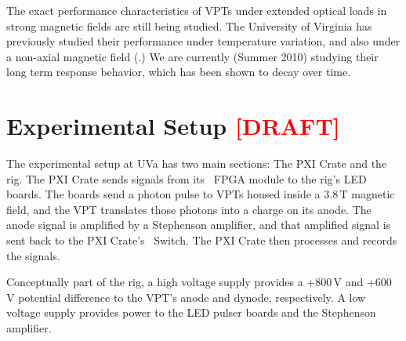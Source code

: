 The exact performance characteristics of VPTs under extended optical loads in strong magnetic fields are still being studied.  The University of Virginia has previously studied their performance under temperature variation, and also under a non-axial magnetic field (.)  We are currently (Summer 2010) studying their long term response behavior, which has been shown to decay over time.

\section{Experimental Setup \textcolor{red}{[DRAFT]}}
\label{sec:eq_intro:setup}

The experimental setup at UVa has two main sections: The \Gls{PXI Crate} and the \Gls{rig}.  The \gls{PXI Crate} sends signals from its \pxislottwo{}~\gls{FPGA} module to the rig's \glspl{LED board}.  The boards send a photon pulse to VPTs housed inside a 3.8\,T magnetic field, and the VPT translates those photons into a charge on its anode.  The anode signal is amplified by a Stephenson amplifier, and that amplified signal is sent back to the PXI Crate's ~Switch.  The PXI Crate then processes and records the signals.

Conceptually part of the rig, a high voltage supply provides a +800\,V and +600\,V potential difference to the VPT's anode and dynode, respectively.  A low voltage supply provides power to the LED pulser boards and the Stephenson amplifier.

